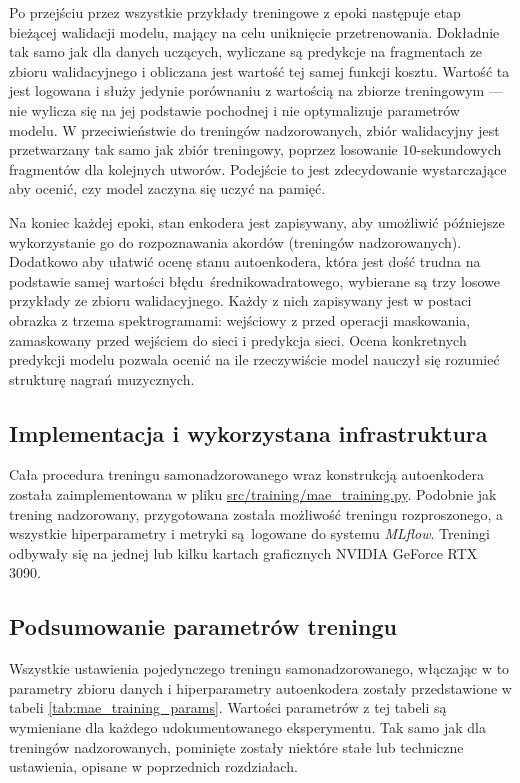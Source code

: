 Po przejściu przez wszystkie przykłady treningowe z epoki następuje etap bieżącej walidacji modelu,
mający na celu uniknięcie przetrenowania. Dokładnie tak samo jak dla danych uczących, wyliczane są
predykcje na fragmentach ze zbioru walidacyjnego i obliczana jest wartość tej samej funkcji kosztu.
Wartość ta jest logowana i służy jedynie porównaniu z wartością na zbiorze treningowym --- nie
wylicza się na jej podstawie pochodnej i nie optymalizuje parametrów modelu. W przeciwieństwie do
treningów nadzorowanych, zbiór walidacyjny jest przetwarzany tak samo jak zbiór treningowy, poprzez
losowanie $10$-sekundowych fragmentów dla kolejnych utworów. Podejście to jest zdecydowanie
wystarczające aby ocenić, czy model zaczyna się uczyć na pamięć.

Na koniec każdej epoki, stan enkodera jest zapisywany, aby umożliwić późniejsze wykorzystanie go do
rozpoznawania akordów (treningów nadzorowanych). Dodatkowo aby ułatwić ocenę stanu autoenkodera,
która jest dość trudna na podstawie samej wartości błędu średnikowadratowego, wybierane są trzy
losowe przykłady ze zbioru walidacyjnego. Każdy z nich zapisywany jest w postaci obrazka z trzema
spektrogramami: wejściowy z przed operacji maskowania, zamaskowany przed wejściem do sieci i
predykcja sieci. Ocena konkretnych predykcji modelu pozwala ocenić na ile rzeczywiście model nauczył
się rozumieć strukturę nagrań muzycznych.

\subsection{Implementacja i wykorzystana infrastruktura}

Cała procedura treningu samonadzorowanego wraz konstrukcją autoenkodera została zaimplementowana w
pliku \url{src/training/mae_training.py}. Podobnie jak trening nadzorowany, przygotowana zostala
możliwość treningu rozproszonego, a wszystkie hiperparametry i metryki są logowane do systemu
\emph{MLflow}. Treningi odbywały się na jednej lub kilku kartach graficznych NVIDIA GeForce RTX
3090.

\subsection{Podsumowanie parametrów treningu}

Wszystkie ustawienia pojedynczego treningu samonadzorowanego, włączając w to parametry zbioru
danych i hiperparametry autoenkodera zostały przedstawione w tabeli \ref{tab:mae_training_params}.
Wartości parametrów z tej tabeli są wymieniane dla każdego udokumentowanego eksperymentu. Tak samo
jak dla treningów nadzorowanych, pominięte zostały niektóre stałe lub techniczne ustawienia,
opisane w poprzednich rozdziałach. 

